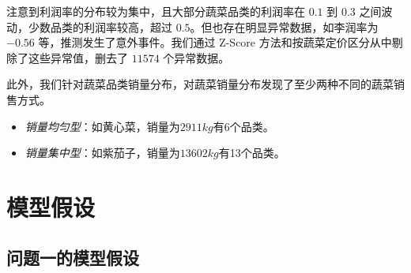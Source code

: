 \documentclass{article}
\begin{document}
注意到利润率的分布较为集中，且大部分蔬菜品类的利润率在 $0.1$ 到 $0.3$ 之间波动，少数品类的利润率较高，超过 $0.5$。但也存在明显异常数据，如李润率为 $-0.56$ 等，推测发生了意外事件。我们通过 Z-Score 方法和按蔬菜定价区分从中剔除了这些异常值，删去了 $11574$ 个异常数据。

此外，我们针对蔬菜品类销量分布，对蔬菜销量分布发现了至少两种不同的蔬菜销售方式。
\begin{itemize}
    \item \textit{销量均匀型}：如黄心菜，销量为$2911 kg$有6个品类。
    \item \textit{销量集中型}：如紫茄子，销量为$13602 kg$有13个品类。
\end{itemize}
\section{模型假设}

\subsection{问题一的模型假设}
\end{document}
